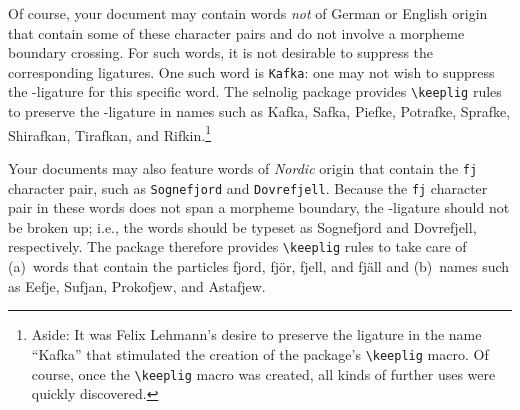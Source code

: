 \documentclass[11pt]{article}
\newcommand{\pkg}[1]{\textsf{#1}}
\newcommand{\opt}[1]{\texttt{#1}}
\newcommand{\cmmd}[1]{\texttt{\textbackslash #1}}
\begin{document}
Of course, your document may contain words \emph{not} of German or English origin that contain some of these character pairs and do not involve a morpheme boundary crossing. For such words, it is not desirable to suppress the corresponding ligatures. One such word is \opt{Kafka}: one may not wish to suppress the {\ebg{}}-ligature for this specific word. The \pkg{selnolig} package provides \cmmd{keeplig} rules to preserve the {\ebg{}}-ligature in names such as {\ebg Kafka, Safka, Piefke, Potrafke, Sprafke, Shirafkan, Tirafkan}, and {\ebg Rifkin}.\footnote{Aside: It was Felix Lehmann's desire to preserve the {\ebg{}} ligature in the name \enquote{{\ebg Kafka}} that stimulated the creation of the package's \cmmd{keeplig} macro. Of course, once the \cmmd{keeplig} macro was created, all kinds of further uses were quickly discovered.} 

Your documents may also feature words of \emph{Nordic} origin that contain the \opt{fj} character pair, such as \opt{Sognefjord} and \opt{Dovrefjell}. Because the \opt{fj} character pair in these words does not span a morpheme boundary, the {\ebg{}}-ligature should not be broken up; i.e., the words should be typeset as {\ebg Sognefjord and Dovrefjell}, respectively. The package therefore provides \cmmd{keeplig} rules to take care of (a)~words that contain the particles {\ebg fjord, fjör, fjell, and fjäll} and (b)~names such as {\ebg Eefje, Sufjan, Prokofjew, and Astafjew}.
\end{document}
